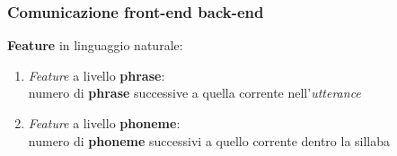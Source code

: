 \begin{frame}
  \frametitle{Comunicazione front-end back-end}
  \textbf{Feature} in linguaggio naturale:
       \begin{enumerate}
         \item \textit{Feature} a livello \textbf{phrase}: \\
           numero di \textbf{phrase} 
           successive a quella corrente nell'\textit{utterance}
         \item \textit{Feature} a livello \textbf{phoneme}: \\
           numero di \textbf{phoneme} successivi a quello corrente dentro la sillaba
       \end{enumerate}    
\end{frame}
